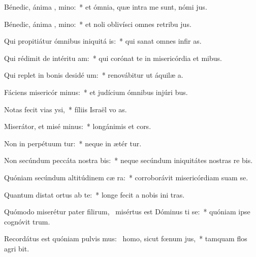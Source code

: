 \item Bénedic, ánima , mino:~* et ómnia, quæ intra me sunt, nómi  jus.
\item Bénedic, ánima , mino:~* et noli oblivísci omnes retribu jus.
\item Qui propitiátur ómnibus iniquitá is:~* qui sanat omnes infir as.
\item Qui rédimit de intéritu  am:~* qui corónat te in misericórdia et mibus.
\item Qui replet in bonis desidé um:~* renovábitur ut áquilæ  a.
\item Fáciens misericór minus:~* et judícium ómnibus injúri bus.
\item Notas fecit vias  ysi,~* fíliis Israël vo as.
\item Miserátor, et misé minus:~* longánimis et  cors.
\item Non in perpétuum tur:~* neque in ætér tur.
\item Non secúndum peccáta nostra  bis:~* neque secúndum iniquitátes nostras re bis.
\item Quóniam secúndum altitúdinem cæ  ra:~* corroborávit misericórdiam suam   se.
\item Quantum distat ortus ab te:~* longe fecit a nobis ini tras.
\item Quómodo miserétur pater filirum,~\pscross{} misértus est Dóminus ti se:~* quóniam ipse cognóvit  trum.
\item Recordátus est quóniam pulvis mus:~\pscross{} homo, sicut fœnum  jus,~* tamquam flos agri  bit.
